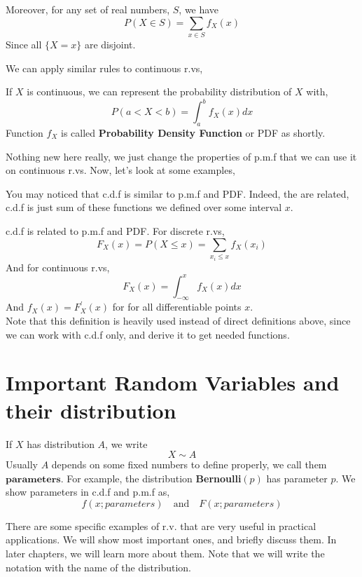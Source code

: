 Moreover, for any set of real numbers, $S$, we have
\[ P (X \in S) = \sum_{x \in S} f_X(x)\]
Since all $\{X = x \}$  are disjoint.\\
\par
We can apply similar rules to continuous r.vs,
\begin{definition}
    If $X$ is continuous, we can represent the probability distribution of $X$ with,
    \[ P(a < X < b) = \int_{a}^{b} f_X(x) dx \]
    Function  $f_X$ is called \textbf{Probability Density Function} or PDF as shortly.
\end{definition}
Nothing new here really, we just change the properties of p.m.f that we can use it on continuous r.vs. Now, let's look at some examples,\\
\par
You may noticed that c.d.f is similar to p.m.f and PDF. Indeed, the are related, c.d.f is just sum of these functions we defined over some interval $x$.
\begin{definition}
    c.d.f is related to p.m.f and PDF. For discrete r.vs,
    \[F_X(x) = P(X \le x) = \sum_{x_i \le x} f_X(x_i)\]
    And for continuous r.vs,
    \[F_X(x)= \int_{-\infty}^x f_X(x)dx \]
    And $f_X(x) = F_X^{'}(x)$ for for all differentiable points $x$.\\
  
    Note that this definition is heavily used instead of direct definitions above, since we can work with c.d.f only, and derive it to get needed functions.
\end{definition}
\par





\section{Important Random Variables and their distribution}
\begin{definition}
    If $X$ has distribution $A$, we write
    \[ X \sim A\]
    Usually $A$ depends on some fixed numbers to define properly, we call them $\textbf{parameters}$. For example, the distribution \textbf{Bernoulli}$(p)$ has parameter $p$. We show parameters in c.d.f and p.m.f as,
    \[ f(x; parameters) \quad \text{and} \quad F(x; parameters) \]
    
\end{definition}
There are some specific examples of r.v. that are very useful in practical applications. We will show most important ones, and briefly discuss them. In later chapters, we will learn more about them. Note that we will write the notation with the name of the distribution.

